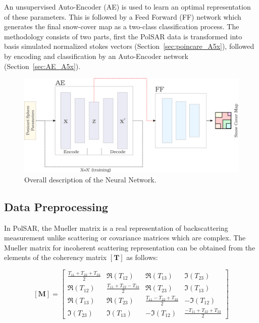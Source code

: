 


An unsupervised Auto-Encoder (AE) is used to learn an optimal representation of these parameters. This is followed by a Feed Forward (FF) network which generates the final snow-cover map as a two-class classification process. The methodology consists of two parts, first the PolSAR data is transformed into basis simulated normalized stokes vectors (Section~\ref{sec:poincare_A5x}), followed by encoding and classification by an Auto-Encoder network (Section~\ref{sec:AE_A5x}).


 
\begin{figure}[!htbp]
\centering
\includegraphics[width=\textwidth]{Figures/SnowCover2018/FlowChart}
\caption{Overall description of the Neural Network.}
\label{fig:flow}
\end{figure}

\subsection{Data Preprocessing}\label{sec:method}
\label{sec:poincare_A5x}
In PolSAR, the Mueller matrix is a real representation of backscattering measurement unlike scattering or covariance matrices which are complex. The Mueller matrix for incoherent scattering representation can be obtained from the elements of the coherency matrix $[\mathbf{T}]$ as follows:

\begin{equation}\label{incoKen}
[\mathbf{M}] =
\left[\begin{array}{cccc}
\frac{T_{11}+T_{22}+ T_{33}}{2} & \Re(T_{12}) & \Re(T_{13}) & \Im(T_{23})\\
\Re(T_{12}) & \frac{T_{11}+T_{22}-T_{33}}{2} & \Re(T_{23}) & \Im(T_{13})\\
\Re(T_{13}) & \Re(T_{23}) & \frac{T_{11}-T_{22}+T_{33}}{2} & - \Im(T_{12})\\
\Im(T_{23}) & \Im(T_{13}) & - \Im(T_{12}) &\frac{-T_{11}+T_{22}+T_{33}}{2}
\end{array}\right]
\end{equation}

